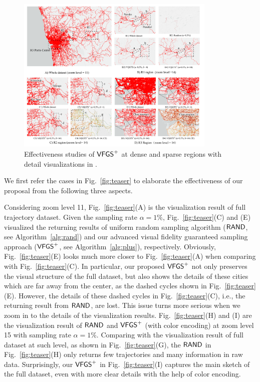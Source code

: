 \begin{figure}[t]
	\centering
	\includegraphics[width=0.85\textwidth]{pictures/experiment_study/case_porto.pdf}
	\vspace{-3mm}
	\caption{Effectiveness studies of $\mathsf{VFGS}^{+}$ at dense and sparse regions with detail visualizations in \pt{}.}
	\label{fig:porto}
    \vspace{-6mm}
\end{figure}

We first refer the cases in Fig.~\ref{fig:teaser} to elaborate the effectiveness of our proposal from the following three aspects.

Considering zoom level 11, Fig.~\ref{fig:teaser}(A) is the visualization result of full \pt{} trajectory dataset.
Given the sampling rate $\alpha = 1\%$, Fig.~\ref{fig:teaser}(C) and (E) visualized the returning results of uniform random sampling algorithm ($\mathsf{RAND}$, see Algorithm~\ref{alg:rand})
and our advanced visual fidelity guaranteed sampling approach ($\mathsf{VFGS}^{+}$, see Algorithm~\ref{alg:plus}), respectively.
Obviously, Fig.~\ref{fig:teaser}(E) looks much more closer to Fig.~\ref{fig:teaser}(A) when comparing with Fig.~\ref{fig:teaser}(C).
In particular, our proposed $\mathsf{VFGS}^{+}$ not only preserves the visual structure of the full dataset,
but also shows the details of these cities which are far away from the center, as the dashed cycles shown in Fig.~\ref{fig:teaser}(E).
However, the details of these dashed cycles in Fig.~\ref{fig:teaser}(C), i.e., the returning result from $\mathsf{RAND}{}$, are lost.
This issue turns more serious when we zoom in to the details of the visualization results.
Fig.~\ref{fig:teaser}(H) and (I) are the visualization result of $\mathsf{RAND}$ and $\mathsf{VFGS}^{+}$  (with color encoding) at zoom level 15 with sampling rate $\alpha=1\%$.
Comparing with the visualization result of full dataset at such level, as shown in Fig.~\ref{fig:teaser}(G),
the $\mathsf{RAND}{}$ in Fig.~\ref{fig:teaser}(H) only returns few trajectories and many information in raw data.
Surprisingly, our $\mathsf{VFGS}^{+}$ in Fig.~\ref{fig:teaser}(I) captures the main sketch of the full dataset, even with more clear details with the help of color encoding.

